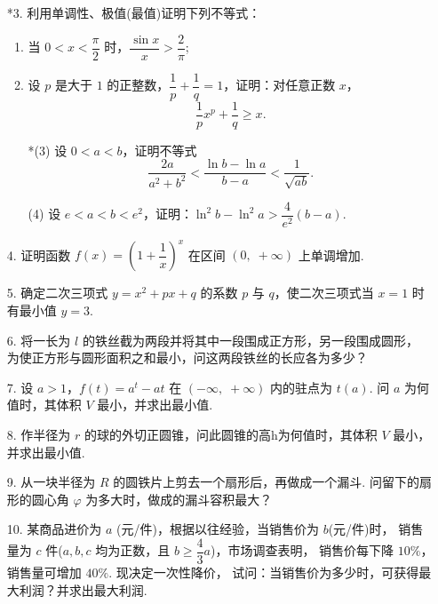 \begin{enumerate}
    \item[*3.] 利用单调性、极值(最值)证明下列不等式：
    \begin{enumerate}[(1)]\setlength{\itemsep}{5pt}\setlength{\topsep}{15pt}
        \item 当 $0<x<\dfrac{\pi}{2}$ 时，$\dfrac{\sin x}{x}>\dfrac{2}{\pi}$;
        \item 设 $p$ 是大于 $1$ 的正整数，$\dfrac{1}{p}+\dfrac{1}{q}=1$，证明：对任意正数 $x$，
        \[
            \dfrac{1}{p}x^p+\dfrac{1}{q}\geqslant x.
        \]
        \item[*(3)] 设 $0<a<b$，证明不等式
        \[
            \dfrac{2a}{a^2+b^2}<\dfrac{\ln b-\ln a}{b-a}<\dfrac{1}{\sqrt{ab}}.
        \]
        \item[(4)] 设 $e<a<b<e^2$，证明：$\ln^2b-\ln^2a>\dfrac{4}{e^2}(b-a)$. 
    \end{enumerate}

    \item[4.] 证明函数 $f(x)=\left(1+\dfrac{1}{x}\right)^x$ 在区间 $(0,\;+\infty)$ 上单调增加.
    
    \item[5.] 确定二次三项式 $y=x^2+px+q$ 的系数 $p$ 与 $q$，使二次三项式当 $x=1$ 时有最小值 $y=3$.
    
    \item[6.] 将一长为 $l$ 的铁丝截为两段并将其中一段围成正方形，另一段围成圆形，
    为使正方形与圆形面积之和最小，问这两段铁丝的长应各为多少？  

    \item[7.] 设 $a>1$，$f(t)=a^t-at$ 在 $(-\infty,\;+\infty)$ 内的驻点为 $t(a)$. 
    问 $a$ 为何值时，其体积 $V$ 最小，并求出最小值.

    \item[8.] 作半径为 $r$ 的球的外切正圆锥，问此圆锥的高h为何值时，其体积 $V$ 最小，并求出最小值.
    
    \item[9.] 从一块半径为 $R$ 的圆铁片上剪去一个扇形后，再做成一个漏斗. 
    问留下的扇形的圆心角 $\varphi$ 为多大时，做成的漏斗容积最大？

    \item[10.] 某商品进价为 $a$ (元/件)，根据以往经验，当销售价为 $b$(元/件)时，
    销售量为 $c$ 件($a,b,c$ 均为正数，且 $b\geqslant \dfrac{4}{3}a$)，市场调查表明，
    销售价每下降 $10\%$，销售量可增加 $40\%$. 现决定一次性降价，
    试问：当销售价为多少时，可获得最大利润？并求出最大利润.
      

\end{enumerate}

